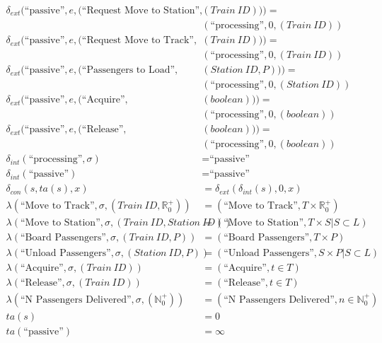 \begin{align*}
\delta_{ext}(\text{``passive''},e,(\text{``Request Move to Station''},&(Train\ ID))) = \\
&(\text{``processing''},0,(Train\ ID)) \\
\delta_{ext}(\text{``passive''},e,(\text{``Request Move to Track''},&(Train\ ID))) = \\
&(\text{``processing''},0,(Train\ ID)) \\
\delta_{ext}(\text{``passive''},e,(\text{``Passengers to Load''},&(Station\ ID,P))) = \\
&(\text{``processing''},0,(Station\ ID)) \\
\delta_{ext}(\text{``passive''},e,(\text{``Acquire''},&(boolean))) = \\
&(\text{``processing''},0,(boolean)) \\
\delta_{ext}(\text{``passive''},e,(\text{``Release''},&(boolean))) = \\
&(\text{``processing''},0,(boolean)) \\
\delta_{int}(\text{``processing''},\sigma) &= \text{``passive''} \\
\delta_{int}(\text{``passive''}) &= \text{``passive''} \\
\delta_{con}(s,ta(s),x) &= \delta_{ext}(\delta_{int}(s),0,x) \\
\lambda(\text{``Move to Track''},\sigma,(Train\ ID,\mathbb{R}_0^+)) &= (\text{``Move to Track''},T\times\mathbb{R}_0^+) \\
\lambda(\text{``Move to Station''},\sigma,(Train\ ID,Station\ ID)) &= (\text{``Move to Station''},T\times S | S\subset L) \\
\lambda(\text{``Board Passengers''},\sigma,(Train\ ID,P)) &= (\text{``Board Passengers''},T\times P) \\
\lambda(\text{``Unload Passengers''},\sigma,(Station\ ID,P)) &= (\text{``Unload Passengers''}, S\times P | S\subset L) \\
\lambda(\text{``Acquire''},\sigma,(Train\ ID)) &= (\text{``Acquire''},t\in T) \\
\lambda(\text{``Release''},\sigma,(Train\ ID)) &= (\text{``Release''},t\in T) \\
\lambda(\text{``N Passengers Delivered''},\sigma,(\mathbb{N}_0^+)) &= (\text{``N Passengers Delivered''},n\in \mathbb{N}_0^+) \\
ta(s) &= 0 \\ 
ta(\text{``passive''}) &= \infty \\
\end{align*}

